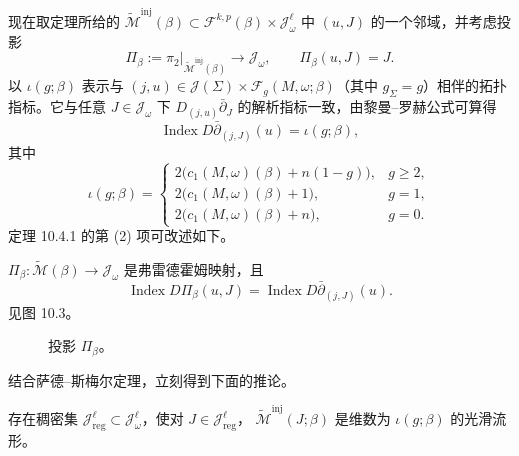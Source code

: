 现在取定理所给的
$\widetilde{\mathcal M}^{\mathrm{inj}}(\beta)\subset
\mathcal F^{k,p}(\beta)\times\mathcal J_\omega^\ell$ 中 $(u,J)$ 的一个邻域，并考虑投影
\[
 \Pi_\beta:=\left.\pi_2\right|_{\widetilde{\mathcal M}^{\mathrm{inj}}(\beta)}
 \longrightarrow\mathcal J_\omega,
 \qquad \Pi_\beta(u,J)=J.
\]
以 $\iota(g;\beta)$ 表示与
$(j,u)\in\mathcal J(\Sigma)\times\mathcal F_g(M,\omega;\beta)$（其中 $g_\Sigma=g$）相伴的拓扑指标。它与任意
$J\in\mathcal J_\omega$ 下 $D_{(j,u)}\bar\partial_J$ 的解析指标一致，由黎曼--罗赫公式可算得
\[
 \operatorname{Index}D\bar\partial_{(j,J)}(u)=\iota(g;\beta),
\]
其中
\begin{equation}
 \iota(g;\beta)=
 \begin{cases}
  2\bigl(c_1(M,\omega)(\beta)+n(1-g)\bigr),&g\geq2,\\
  2\bigl(c_1(M,\omega)(\beta)+1\bigr),&g=1,\\
  2\bigl(c_1(M,\omega)(\beta)+n\bigr),&g=0.
 \end{cases}
 \label{eq:topological-index-by-genus}
\end{equation}
定理 10.4.1 的第 (2) 项可改述如下。

\begin{proposition}\label{prop:fredholm-projection-universal-moduli}
$\Pi_\beta:\widetilde{\mathcal M}(\beta)\to\mathcal J_\omega$ 是弗雷德霍姆映射，且
\[
 \operatorname{Index}D\Pi_\beta(u,J)
 =\operatorname{Index}D\bar\partial_{(j,J)}(u).
\]
见图 10.3。
\end{proposition}

\begin{figure}[htbp]
 \centering
 
 \caption{投影 $\Pi_\beta$。}
 \label{fig:projection-pi-beta}
\end{figure}

结合萨德--斯梅尔定理，立刻得到下面的推论。

\begin{corollary}\label{cor:dense-regular-almost-complex-structures}
存在稠密集 $\mathcal J_{\mathrm{reg}}^\ell\subset\mathcal J_\omega^\ell$，使对
$J\in\mathcal J_{\mathrm{reg}}^\ell$，
$\widetilde{\mathcal M}^{\mathrm{inj}}(J;\beta)$ 是维数为
$\iota(g;\beta)$ 的光滑流形。
\end{corollary}


